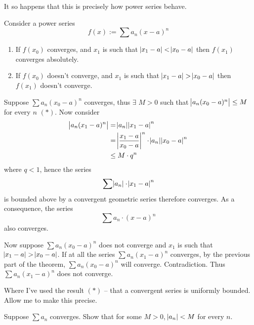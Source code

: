 It so happens that this is precisely how power series behave.
\begin{SWP}{\lm}{Consider a power series
$$f(x) := \sum a_n (x - a)^n$$
\begin{enumerate}\item If $f(x_0)$ converges, and $x_1$ is such that $\abs{x_1 - a} < \abs{x_0 - a}$ then $f(x_1)$ converges absolutely.\item If $f(x_0)$ doesn't converge, and $x_1$ is such that $\abs{x_1 - a} > \abs{x_0 - a}$ then $f(x_1)$ doesn't converge.\end{enumerate}}Suppose $\sum a_n (x_0 - a)^n$ converges, thus $\exists$ $M > 0$ such that $\abs{a_n (x_0 - a)^n} \leq M$ for every $n$ $(\ast)$. Now consider
\begin{align*}
\abs{a_n (x_1 - a)^n} &= \abs{a_n}\abs{x_1 - a}^n\\
					  &= \abs{\dfrac{x_1 - a}{x_0 - a}}^n \cdot \abs{a_n}\abs{x_0 - a}^n\\
					  &\leq M\cdot q^n
\end{align*}
where $q < 1$, hence the series
$$
\sum \abs{a_n}\cdot \abs{x_1 - a}^n
$$
is bounded above by a convergent geometric series therefore converges. As a consequence, the series
$$
\sum a_n\cdot (x - a)^n
$$
also converges.

Now suppose $\sum a_n (x_0 - a)^n$ does not converge and $x_1$ is such that $\abs{x_1 - a} > \abs{x_0 - a}$. If at all the series $\sum a_n (x_1 - a)^n$ converges, by the previous part of the theorem, $\sum a_n (x_0 - a)^n$ will converge. Contradiction. Thus $\sum a_n (x_1 - a)^n$ does not converge.
\end{SWP}

Where I've used the result $(\ast)$ -- that a convergent series is uniformly bounded. Allow me to make this precise.
\begin{SNP}{\ex}Suppose $\sum a_n$ converges. Show that for some $M > 0$, $\abs{a_n} < M$ for every $n$.
\end{SNP}

